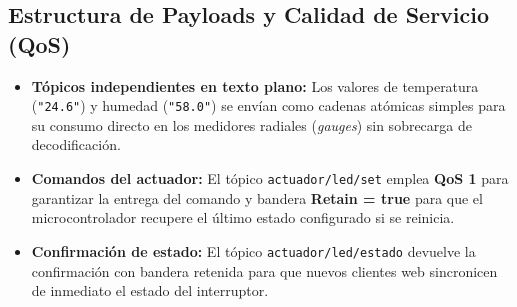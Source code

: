 \subsection{Estructura de Payloads y Calidad de Servicio (QoS)}
\begin{itemize}[noitemsep]
    \item \practicaBadge \textbf{Tópicos independientes en texto plano:} Los valores de temperatura (\texttt{"24.6"}) y humedad (\texttt{"58.0"}) se envían como cadenas atómicas simples para su consumo directo en los medidores radiales (\textit{gauges}) sin sobrecarga de decodificación.
    \item \practicaBadge \textbf{Comandos del actuador:} El tópico \texttt{actuador/led/set} emplea \textbf{QoS 1} para garantizar la entrega del comando y bandera \textbf{Retain = true} para que el microcontrolador recupere el último estado configurado si se reinicia.
    \item \practicaBadge \textbf{Confirmación de estado:} El tópico \texttt{actuador/led/estado} devuelve la confirmación con bandera retenida para que nuevos clientes web sincronicen de inmediato el estado del interruptor.
\end{itemize}
